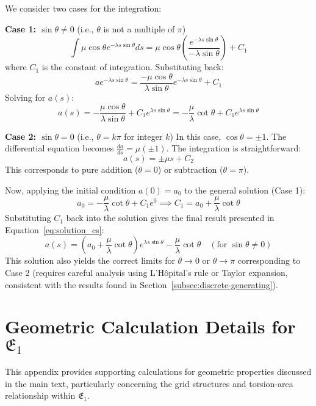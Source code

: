 \documentclass[12pt]{article}
\begin{document}
We consider two cases for the integration:

\textbf{Case 1: \( \sin \theta \neq 0 \)} (i.e., \( \theta \) is not a multiple of \( \pi \))
\[
\int \mu \cos \theta e^{-\lambda s \sin \theta} ds = \mu \cos \theta \left( \frac{e^{-\lambda s \sin \theta}}{-\lambda \sin \theta} \right) + C_1
\]
where \( C_1 \) is the constant of integration. Substituting back:
\[
a e^{-\lambda s \sin \theta} = \frac{-\mu \cos \theta}{\lambda \sin \theta} e^{-\lambda s \sin \theta} + C_1
\]
Solving for \( a(s) \):
\[
a(s) = -\frac{\mu \cos \theta}{\lambda \sin \theta} + C_1 e^{\lambda s \sin \theta} = -\frac{\mu}{\lambda} \cot \theta + C_1 e^{\lambda s \sin \theta}
\]

\textbf{Case 2: \( \sin \theta = 0 \)} (i.e., \( \theta = k\pi \) for integer \( k \))
In this case, \( \cos \theta = \pm 1 \). The differential equation becomes \( \frac{da}{ds} = \mu (\pm 1) \). The integration is straightforward:
\[
a(s) = \pm \mu s + C_2
\]
This corresponds to pure addition (\( \theta = 0 \)) or subtraction (\( \theta = \pi \)).

Now, applying the initial condition \( a(0) = a_0 \) to the general solution (Case 1):
\[
a_0 = -\frac{\mu}{\lambda} \cot \theta + C_1 e^0 \implies C_1 = a_0 + \frac{\mu}{\lambda} \cot \theta
\]
Substituting \( C_1 \) back into the solution gives the final result presented in Equation~\eqref{eq:solution_cs}:
\begin{equation}
   a(s) = \left(a_0 + \frac{\mu}{\lambda} \cot \theta\right) e^{\lambda s \sin \theta} - \frac{\mu}{\lambda} \cot \theta \quad (\text{for } \sin \theta \neq 0) \label{eq:solution_appendix_cs}
\end{equation}
This solution also yields the correct limits for \( \theta \to 0 \) or \( \theta \to \pi \) corresponding to Case 2 (requires careful analysis using L'Hôpital's rule or Taylor expansion, consistent with the results found in Section~\ref{subsec:discrete-generating}). %


\section{Geometric Calculation Details for \( \mathfrak{E}_1 \)} %
\label{app:geometry_calc}

This appendix provides supporting calculations for geometric properties discussed in the main text, particularly concerning the grid structures and torsion-area relationship within \( \mathfrak{E}_1 \).
\end{document}
